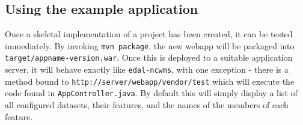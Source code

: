 \documentclass[a4paper]{article}
\begin{document}
\subsection{Using the example application}
Once a skeletal implementation of a project has been created, it can be tested
immediately.  By invoking {\tt mvn package}, the new webapp will be packaged
into {\tt target/appname-version.war}.  Once this is deployed to a suitable
application server, it will behave exactly like {\tt edal-ncwms}, with one
exception - there is a method bound to {\tt http://server/webapp/vendor/test}
which will execute the code found in {\tt AppController.java}.  By default this
will simply display a list of all configured datasets, their features, and the
names of the members of each feature.
\end{document}
